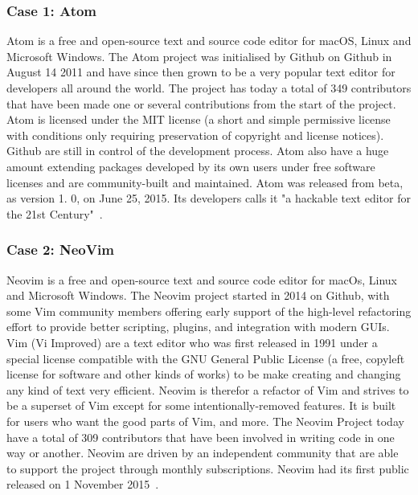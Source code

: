 \documentclass[a4paper,11pt]{article}
\begin{document}
{%
\subsubsection{Case 1: Atom}
Atom is a free and open-source text and source code editor for macOS, Linux and Microsoft Windows. The Atom project was initialised by Github on Github in August 14 2011 and have since then grown to be a very popular text editor for developers all around the world. The project has today a total of 349 contributors that have been made one or several contributions from the start of the project. Atom is licensed under the MIT license (a short and simple permissive license with conditions only requiring preservation of copyright and license notices). Github are still in control of the development process. Atom also have a huge amount extending packages developed by its own users under free software licenses and are community-built and maintained. Atom was released from beta, as version 1. 0, on June 25, 2015. Its developers calls it "a hackable text editor for the 21st Century"~\cite{atom_wp,atom_pp}.


\subsubsection{Case 2: NeoVim}
\label{neo_vim}
Neovim is a free and open-source text and source code editor for macOs, Linux and Microsoft Windows. The Neovim project started in 2014 on Github, with some Vim community members offering early support of the high-level refactoring effort to provide better scripting, plugins, and integration with modern GUIs. Vim (Vi Improved) are a text editor who was first released in 1991 under a special license compatible with the GNU General Public License (a free, copyleft license for software and other kinds of works) to be make creating and changing any kind of text very efficient. Neovim is therefor a refactor of Vim and strives to be a superset of Vim except for some intentionally-removed features. It is built for users who want the good parts of Vim, and more. The Neovim Project today have a total of 309 contributors that have been involved in writing code in one way or another. Neovim are driven by an independent community that are able to support the project through monthly subscriptions. Neovim had its first public released on 1 November 2015~\cite{neovim_wp,neovim_wiki}.

}
\end{document}
